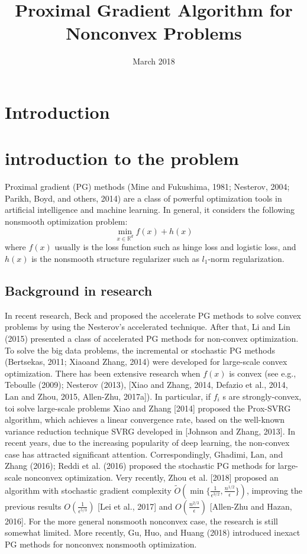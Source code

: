 \documentclass{article}
\title{Proximal Gradient Algorithm for Nonconvex Problems}
\date{March 2018}
\newcommand*{\R}{\mathbb{R}}
\theoremstyle{definition}
\theoremstyle{remark}
\begin{document}
\maketitle

\section{Introduction}
\section{introduction to the problem}
{\color{Green}
Proximal gradient (PG) methods (Mine and Fukushima,
1981; Nesterov, 2004; Parikh, Boyd, and others, 2014) are a
class of powerful optimization tools in artificial intelligence
and machine learning. In general, it considers the following
nonsmooth optimization problem:
\begin{equation}
\min_{x\in\R^d} f(x) + h(x)
\end{equation}
where $f(x)$ usually is the loss function such as hinge loss and logistic loss, and $h(x)$ is the nonsmooth structure regularizer such as $l_1$-norm regularization. 
}
\subsection{Background in research}
{\color{Green}
In recent research,
Beck and  proposed the accelerate PG methods to solve convex problems by using the Nesterov’s accelerated technique. After that, Li and Lin (2015) presented a class of accelerated PG methods for non-convex optimization.  To solve the big data problems, the incremental or stochastic PG methods (Bertsekas, 2011; Xiaoand Zhang, 2014) were developed for large-scale convex optimization. 
}
{\color{Violet}
There has been extensive research when $f(x)$ is convex (see e.g., {\color{green} Teboulle (2009); Nesterov (2013)}, [Xiao and Zhang, 2014, Defazio et al., 2014, Lan and Zhou,
2015, Allen-Zhu, 2017a]). In particular, if $f_i$ s are strongly-convex, {\color{green} toi solve large-scale problems} Xiao and Zhang [2014] proposed the Prox-SVRG algorithm, which achieves a linear convergence rate, based on the well-known variance reduction technique SVRG
developed in [Johnson and Zhang, 2013]. 
In recent years, due to the increasing popularity of deep learning, the non-convex case has attracted significant attention.
{\color{Green} Correspondingly, Ghadimi, Lan, and Zhang (2016); Reddi et al. (2016) proposed the stochastic PG methods for large-scale nonconvex optimization.}
Very recently, Zhou et al. [2018] proposed an algorithm with stochastic gradient complexity $\widetilde{O}(\min\{\frac{1}{\epsilon^{3/2}},\frac{n^{1/2}}{\epsilon}\})$, improving the previous results
$O(\frac{1}{\epsilon^{5/3}})$ [Lei et al., 2017] and $O(\frac{n^{2/3}}{\epsilon})$ [Allen-Zhu and Hazan, 2016]. For the more general nonsmooth nonconvex case, the research is still somewhat limited. {\color{green} More recently, Gu, Huo, and Huang (2018) introduced inexact PG methods for nonconvex nonsmooth optimization.}
}
\end{document}
